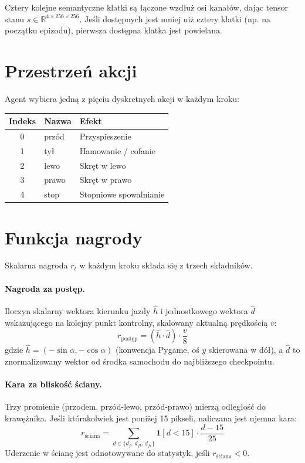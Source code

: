 \documentclass[12pt,a4paper,twocolumn]{article}
\begin{document}
Cztery kolejne semantyczne klatki są łączone wzdłuż osi kanałów, dając tensor stanu $s \in \mathbb{R}^{4 \times 256 \times 256}$.
Jeśli dostępnych jest mniej niż cztery klatki (np. na początku epizodu), pierwsza dostępna klatka jest powielana.

\section{Przestrzeń akcji}

Agent wybiera jedną z pięciu dyskretnych akcji w każdym kroku:

\begin{center}
\begin{tabular}{@{}cll@{}}
  \toprule
  Indeks & Nazwa & Efekt \\
  \midrule
  0 & przód  & Przyspieszenie \\
  1 & tył    & Hamowanie / cofanie \\
  2 & lewo   & Skręt w lewo \\
  3 & prawo  & Skręt w prawo \\
  4 & stop   & Stopniowe spowalnianie \\
  \bottomrule
\end{tabular}
\end{center}

\section{Funkcja nagrody}

Skalarna nagroda $r_t$ w każdym kroku składa się z trzech składników.

\paragraph{Nagroda za postęp.}
Iloczyn skalarny wektora kierunku jazdy $\hat{h}$ i jednostkowego wektora $\hat{d}$ wskazującego na kolejny punkt kontrolny, skalowany aktualną prędkością $v$:
\begin{equation}
  r_\text{postęp} = (\hat{h} \cdot \hat{d}) \cdot \frac{v}{8}
\end{equation}
gdzie $\hat{h} = (-\sin\alpha, -\cos\alpha)$ (konwencja Pygame, oś $y$ skierowana w dół), a $\hat{d}$ to znormalizowany wektor od środka samochodu do najbliższego checkpointu.

\paragraph{Kara za bliskość ściany.}
Trzy promienie (przodem, przód-lewo, przód-prawo) mierzą odległość do krawężnika.
Jeśli którakolwiek jest poniżej 15 pikseli, naliczana jest ujemna kara:
\begin{equation}
  r_\text{ściana} = \sum_{d \in \{d_f,\, d_{fl},\, d_{fr}\}}
    \mathbf{1}[d < 15]\cdot\frac{d - 15}{25}
\end{equation}
Uderzenie w ścianę jest odnotowywane do statystyk, jeśli $r_\text{ściana} < 0$.
\end{document}
